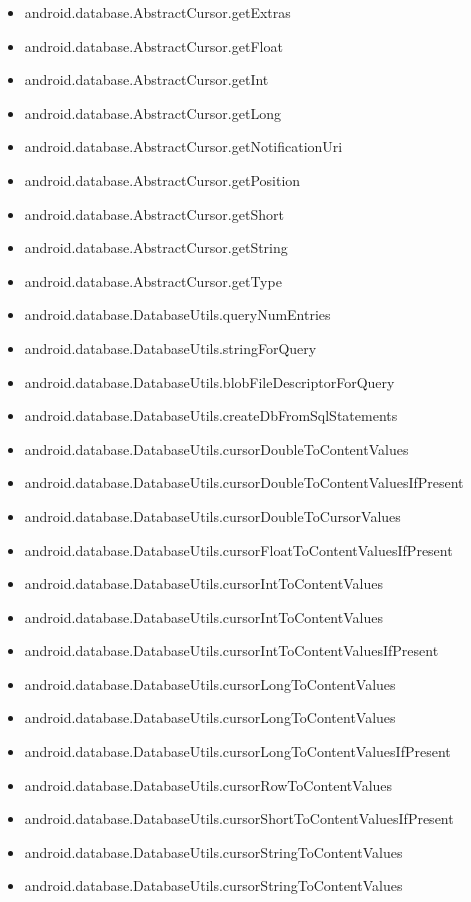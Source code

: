 \documentclass{sig-alternate}
\begin{document}
\begin{itemize}
\item android.database.AbstractCursor.getExtras
\item android.database.AbstractCursor.getFloat
\item android.database.AbstractCursor.getInt
\item android.database.AbstractCursor.getLong
\item android.database.AbstractCursor.getNotificationUri
\item android.database.AbstractCursor.getPosition
\item android.database.AbstractCursor.getShort
\item android.database.AbstractCursor.getString
\item android.database.AbstractCursor.getType
\item android.database.DatabaseUtils.queryNumEntries
\item android.database.DatabaseUtils.stringForQuery
\item android.database.DatabaseUtils.blobFileDescriptorForQuery
\item android.database.DatabaseUtils.createDbFromSqlStatements
\item android.database.DatabaseUtils.cursorDoubleToContentValues
\item android.database.DatabaseUtils.cursorDoubleToContentValuesIfPresent
\item android.database.DatabaseUtils.cursorDoubleToCursorValues
\item android.database.DatabaseUtils.cursorFloatToContentValuesIfPresent
\item android.database.DatabaseUtils.cursorIntToContentValues
\item android.database.DatabaseUtils.cursorIntToContentValues
\item android.database.DatabaseUtils.cursorIntToContentValuesIfPresent
\item android.database.DatabaseUtils.cursorLongToContentValues
\item android.database.DatabaseUtils.cursorLongToContentValues
\item android.database.DatabaseUtils.cursorLongToContentValuesIfPresent
\item android.database.DatabaseUtils.cursorRowToContentValues
\item android.database.DatabaseUtils.cursorShortToContentValuesIfPresent
\item android.database.DatabaseUtils.cursorStringToContentValues
\item android.database.DatabaseUtils.cursorStringToContentValues

\end{itemize}
\end{document}
